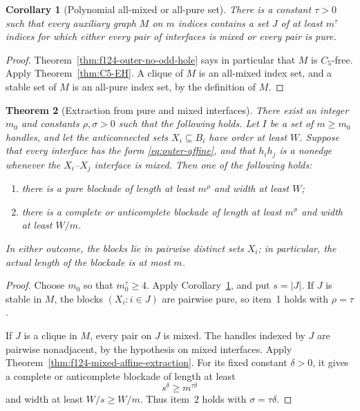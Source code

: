 \documentclass[11pt]{article}
\numberwithin{equation}{section}
\theoremstyle{plain}
\newtheorem{theorem}{Theorem}[section]
\newtheorem{corollary}[theorem]{Corollary}
\theoremstyle{definition}
\begin{document}
\begin{corollary}[Polynomial all-mixed or all-pure set]
\label{cor:f124-outer-c5-extraction}
There is a constant $\tau>0$ such that every auxiliary graph $M$
on $m$ indices contains a set $J$ of at least $m^\tau$ indices for which
either every pair of interfaces is mixed or every pair is pure.
\end{corollary}

\begin{proof}
Theorem~\ref{thm:f124-outer-no-odd-hole} says in particular that $M$ is
$C_5$-free.  Apply Theorem~\ref{thm:C5-EH}.  A clique of $M$ is an all-mixed index set, and
a stable set of $M$ is an all-pure index set, by the definition of $M$.
\end{proof}

\begin{theorem}[Extraction from pure and mixed interfaces]
\label{thm:f124-affine-interface-extraction}
There exist an integer $m_0$ and constants $\rho,\sigma>0$ such that the
following holds.  Let $I$ be a
set of $m\geq m_0$ handles, and let the anticonnected sets
$X_i\subseteq B_i$ have order at least $W$.  Suppose that every
interface has the form \eqref{eq:outer-affine}, and that $h_ih_j$ is a
nonedge whenever the $X_i$--$X_j$ interface is mixed.  Then one of the following
holds:
\begin{enumerate}
 \item there is a pure blockade of length at least $m^\rho$ and width
       at least $W$;
 \item there is a complete or anticomplete blockade of length at least
       $m^\sigma$ and width at least $W/m$.
\end{enumerate}
In either outcome, the blocks lie in pairwise distinct sets $X_i$; in
particular, the actual length of the blockade is at most $m$.
\end{theorem}

\begin{proof}
Choose $m_0$ so that $m_0^\tau\geq4$.
Apply Corollary~\ref{cor:f124-outer-c5-extraction}, and put $s=|J|$.
If $J$ is stable in $M$, the blocks $(X_i:i\in J)$ are pairwise pure,
so item~1 holds with $\rho=\tau$.

If $J$ is a clique in $M$, every pair on $J$ is mixed.  The handles indexed by $J$ are pairwise nonadjacent, by the hypothesis
on mixed interfaces.  Apply
Theorem~\ref{thm:f124-mixed-affine-extraction}.  For its fixed constant
$\delta>0$, it gives a complete or anticomplete blockade of length at
least
\[
                         s^\delta\geq m^{\tau\delta}
\]
and width at least $W/s\geq W/m$.  Thus item~2 holds with
$\sigma=\tau\delta$.
\end{proof}
\end{document}
